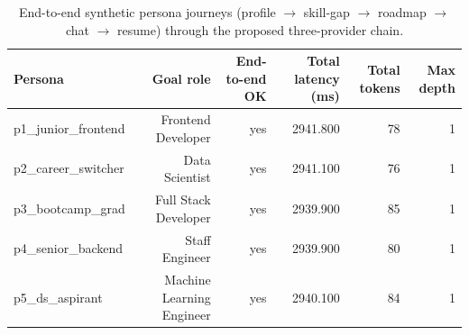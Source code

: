 \begin{table}[t]
\centering
\caption{End-to-end synthetic persona journeys (profile $\to$ skill-gap $\to$ roadmap $\to$ chat $\to$ resume) through the proposed three-provider chain.}
\label{tab:simulator}
\begin{tabular}{lrrrrr}
\hline
Persona & Goal role & End-to-end OK & Total latency (ms) & Total tokens & Max depth \\
\hline
p1\_junior\_frontend & Frontend Developer & yes & 2941.800 & 78 & 1 \\
p2\_career\_switcher & Data Scientist & yes & 2941.100 & 76 & 1 \\
p3\_bootcamp\_grad & Full Stack Developer & yes & 2939.900 & 85 & 1 \\
p4\_senior\_backend & Staff Engineer & yes & 2939.900 & 80 & 1 \\
p5\_ds\_aspirant & Machine Learning Engineer & yes & 2940.100 & 84 & 1 \\
\hline
\end{tabular}
\end{table}
